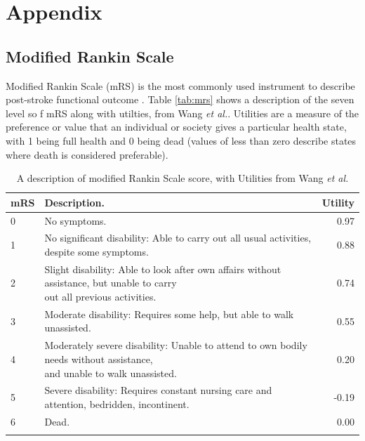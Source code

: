 \section*{Appendix}

\appendix
\setcounter{section}{0}
\renewcommand{\thesection}{A\Alph{section}}
\setcounter{figure}{0}
\renewcommand{\thefigure}{A.\arabic{figure}}
\setcounter{table}{0}
\renewcommand{\thetable}{A.\arabic{table}}

\subsection{Modified Rankin Scale}

Modified Rankin Scale (mRS) is the most commonly used instrument to describe post-stroke functional outcome . Table \ref{tab:mrs} shows a description of the seven level so f mRS along with utilties, from Wang \emph{et al.}\cite{wang_utility-weighted_2020}. Utilities are a measure of the preference or value that an individual or society gives a particular health state, with 1 being full health and 0 being dead (values of less than zero describe states where death is considered preferable).

\begin{minipage}{\textwidth}
\renewcommand*{\arraystretch}{1.5} %
\begin{longtable}[]{@{}llr@{}}
\caption{A description of modified Rankin Scale score, with Utilities from Wang \emph{et al.}\cite{wang_utility-weighted_2020}}\\
\toprule
mRS & Description. & Utility\tabularnewline
\midrule
\endhead
0 & No symptoms. & 0.97\tabularnewline
1 & No significant disability: Able to carry out all usual activities,
despite some symptoms. & 0.88\tabularnewline
2 & \makecell[l]{Slight disability: Able to look after own affairs without assistance, but unable to carry \\ out all previous activities.} &
0.74\tabularnewline
3 & Moderate disability: Requires some help, but able to walk
unassisted. & 0.55\tabularnewline
4 & \makecell[l]{Moderately severe disability: Unable to attend to own bodily needs without assistance, \\ and unable to walk unassisted.} & 0.20\tabularnewline
5 & Severe disability: Requires constant nursing care and attention,
bedridden, incontinent. & -0.19\tabularnewline
6 & Dead. & 0.00\tabularnewline
\bottomrule
\label{app_tab:mrs}
\end{longtable}
\end{minipage}

